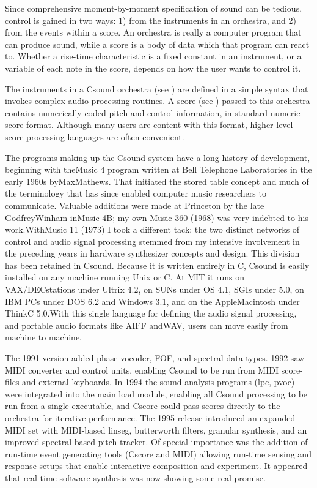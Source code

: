 \documentclass[10pt,letterpaper,onecolumn]{book}
\begin{document}
Since comprehensive moment-by-moment specification of sound can be tedious, control is gained in two
ways: 1) from the instruments in an orchestra, and 2) from the events within a score. An orchestra is really a
computer program that can produce sound, while a score is a body of data which that program can react to.
Whether a rise-time characteristic is a fixed constant in an instrument, or a variable of each note in the score,
depends on how the user wants to control it.

The instruments in a Csound orchestra (see ) are defined in a simple syntax that invokes complex audio
processing routines. A score (see ) passed to this orchestra contains numerically coded pitch and control
information, in standard numeric score format. Although many users are content with this format, higher
level score processing languages are often convenient.

The programs making up the Csound system have a long history of development, beginning with theMusic 4
program written at Bell Telephone Laboratories in the early 1960s byMaxMathews. That initiated the stored
table concept and much of the terminology that has since enabled computer music researchers to
communicate. Valuable additions were made at Princeton by the late GodfreyWinham inMusic 4B; my own
Music 360 (1968) was very indebted to his work.WithMusic 11 (1973) I took a different tack: the two distinct
networks of control and audio signal processing stemmed from my intensive involvement in the preceding
years in hardware synthesizer concepts and design. This division has been retained in Csound.
Because it is written entirely in C, Csound is easily installed on any machine running Unix or C. At MIT it runs
on VAX/DECstations under Ultrix 4.2, on SUNs under OS 4.1, SGIs under 5.0, on IBM PCs under DOS 6.2 and
Windows 3.1, and on the AppleMacintosh under ThinkC 5.0.With this single language for defining the audio
signal processing, and portable audio formats like AIFF andWAV, users can move easily from machine to
machine.

The 1991 version added phase vocoder, FOF, and spectral data types. 1992 saw MIDI converter and control
units, enabling Csound to be run from MIDI score-files and external keyboards. In 1994 the sound analysis
programs (lpc, pvoc) were integrated into the main load module, enabling all Csound processing to be run
from a single executable, and Cscore could pass scores directly to the orchestra for iterative performance. The
1995 release introduced an expanded MIDI set with MIDI-based linseg, butterworth filters, granular
synthesis, and an improved spectral-based pitch tracker. Of special importance was the addition of run-time
event generating tools (Cscore and MIDI) allowing run-time sensing and response setups that enable
interactive composition and experiment. It appeared that real-time software synthesis was now showing
some real promise.
\end{document}
